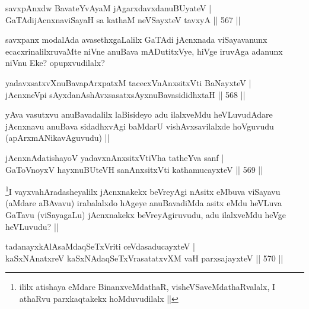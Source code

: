 
\begin{shl}
savxpAnxdw BavateYvAyaM jAgarxdavxdanuBUyateV | \\
GaTAdijAcnxnaviSayaH sa kathaM neVSayxteV tavxyA \hfill ||  567 ||  
\end{shl}

\begin{artha}
savxpanx modalAda avasethxgaLalilx GaTAdi jAcnxnada viSayavanunx ecacxrinalilxruvaMte niVne anuBava mADutitxVye, hiVge iruvAga adanunx niVnu Eke? opupxvudilalx?
\end{artha}


\begin{shl}
yadavxsatxvXnuBavapArxpatxM tacecxVnAnxsitxVti BaNayxteV | \\
jAcnxneV\s pi sAyxdanAshAvxsasatxsAyxnuBavasididhxtaH \hfill||  568 ||  
\end{shl}

\begin{artha}
yAva vasutxvu anuBavadalilx laBisideyo adu ilalxveMdu heVLuvudAdare jAcnxnavu anuBava sidadhxvAgi baMdarU vishAvxsavilalxde hoVguvudu (apArxmANikavAguvudu) ||
\end{artha}


\begin{shl}
jAcnxnAdatishayoV yadavxnAnxsitxVtiVha tatheYva sanf | \\
GaToV\s noyxV hayxnuBUteVH sanAnxsitxVti kathamucayxteV \hfill||  569 ||  
\end{shl}

\begin{artha}
\footnote{ililx atishaya eMdare BinanxveMdathaR, visheVSaveMdathaRvalalx, I athaRvu parxkaqtakekx hoMduvudilalx ||}I vayxvahAradasheyalilx jAcnxnakekx beVreyAgi nAsitx eMbuva viSayavu (aMdare aBAvavu) irabalalxdo hAgeye anuBavadiMda asitx eMdu heVLuva GaTavu (viSayagaLu) jAcnxnakekx beVreyAgiruvudu, adu ilalxveMdu heVge heVLuvudu? ||
\end{artha}

\begin{shl}
tadanayxkAlAsaMdaqSeTxVriti ceVdasaducayxteV | \\
kaSxNAnatxreV kaSxNAdaqSeTxVrasatatxvXM vaH parxsajayxteV \hfill||  570 ||  
\end{shl}

